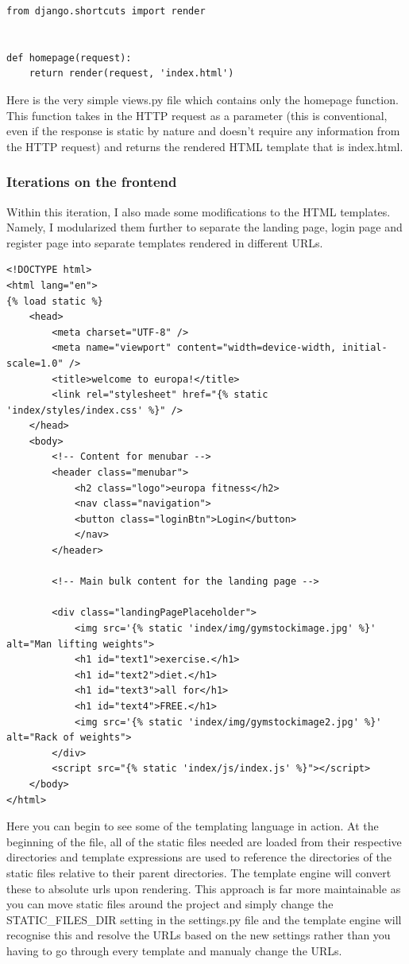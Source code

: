 \documentclass{article}
\begin{document}
\begin{lstlisting}[caption={index/views.py}]
from django.shortcuts import render


def homepage(request):
    return render(request, 'index.html')
\end{lstlisting}

Here is the very simple views.py file which contains only the homepage function. This function takes in the HTTP request as a parameter (this is conventional, even if the response is static by nature and doesn't require any information from the HTTP request) and returns the rendered HTML template that is index.html. 

\subsubsection{Iterations on the frontend}

Within this iteration, I also made some modifications to the HTML templates. Namely, I modularized them further to separate the landing page, login page and register page into separate templates rendered in different URLs. 

\begin{lstlisting}[caption={templates/index.html}]
<!DOCTYPE html>
<html lang="en">
{% load static %}
    <head>
        <meta charset="UTF-8" />
        <meta name="viewport" content="width=device-width, initial-scale=1.0" />
        <title>welcome to europa!</title>
        <link rel="stylesheet" href="{% static 'index/styles/index.css' %}" />
    </head>
    <body>
        <!-- Content for menubar -->
        <header class="menubar">
            <h2 class="logo">europa fitness</h2>
            <nav class="navigation">
            <button class="loginBtn">Login</button>
            </nav>
        </header>

        <!-- Main bulk content for the landing page -->

        <div class="landingPagePlaceholder">
            <img src='{% static 'index/img/gymstockimage.jpg' %}' alt="Man lifting weights">
            <h1 id="text1">exercise.</h1>
            <h1 id="text2">diet.</h1>
            <h1 id="text3">all for</h1>
            <h1 id="text4">FREE.</h1>
            <img src='{% static 'index/img/gymstockimage2.jpg' %}' alt="Rack of weights">
        </div>
        <script src="{% static 'index/js/index.js' %}"></script>
    </body>
</html>
\end{lstlisting}

Here you can begin to see some of the templating language in action. At the beginning of the file, all of the static files needed are loaded from their respective directories and template expressions are used to reference the directories of the static files relative to their parent directories. The template engine will convert these to absolute urls upon rendering. This approach is far more maintainable as you can move static files around the project and simply change the STATIC\_FILES\_DIR setting in the settings.py file and the template engine will recognise this and resolve the URLs based on the new settings rather than you having to go through every template and manualy change the URLs.  
\end{document}
